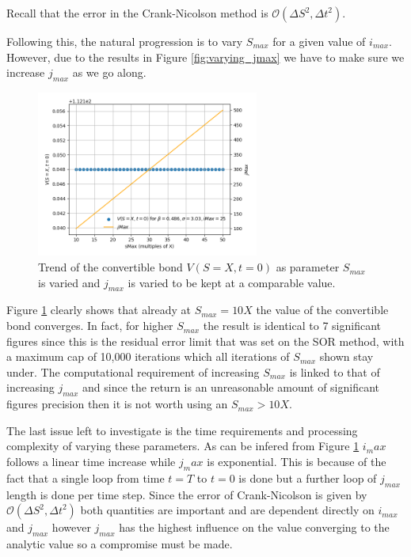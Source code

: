 \documentclass{article}
\begin{document}
Recall that the error in the Crank-Nicolson method is $\mathcal{O}({\Delta S}^2,{\Delta t}^2)$.
\\
\par
Following this, the natural progression is to vary $S_{max}$ for a given value of $i_{max}.$
However, due to the results in Figure \ref{fig:varying_jmax} we have to make sure we increase $j_{max}$ as we go along.
\begin{figure}[!h]
\includegraphics[width=0.65\textwidth,center]{../images/european_varying_smax.png}
\caption{Trend of the convertible bond $V(S=X,t=0)$ as parameter $S_{max}$ is varied and $j_{max}$ is varied to be kept at a comparable value.}
\label{fig:varying_smax}
\end{figure}
Figure \ref{fig:varying_smax} clearly shows that already at $S_{max}=10X$ the value of the convertible bond converges.
In fact, for higher $S_{max}$ the result is identical to 7 significant figures since this is the residual error limit that was set on the SOR method, with a maximum cap of 10,000 iterations which all iterations of $S_{max}$ shown stay under.
The computational requirement of increasing $S_{max}$ is linked to that of increasing $j_{max}$ and since the return is an unreasonable amount of significant figures precision then it is not worth using an $S_{max}>10X$.
\\
\par
The last issue left to investigate is the time requirements and processing complexity of varying these parameters.
As can be infered from Figure \ref{fig:varying_smax} $i_max$ follows a linear time increase while $j_max$ is exponential.
This is because of the fact that a single loop from time $t=T$ to $t=0$ is done but a further loop of $j_{max}$ length is done per time step.
Since the error of Crank-Nicolson is given by $\mathcal{O}({\Delta S}^2,{\Delta t}^2)$ both quantities are important and are dependent directly on $i_{max}$ and $j_{max}$ however $j_{max}$ has the highest influence on the value converging to the analytic value so a compromise must be made.
\end{document}
